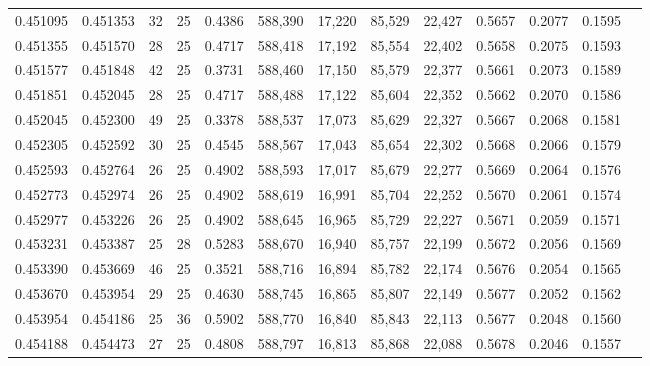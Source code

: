 \begin{tabular}{rrrrrrrrrrrrr}
0.451095 & 0.451353 &    32 &  25 &                                     0.4386 & 588,390 &  17,220 &  85,529 &  22,427 & 0.5657 & 0.2077 & 0.1595 \\
0.451355 & 0.451570 &    28 &  25 &                                     0.4717 & 588,418 &  17,192 &  85,554 &  22,402 & 0.5658 & 0.2075 & 0.1593 \\
0.451577 & 0.451848 &    42 &  25 &                                     0.3731 & 588,460 &  17,150 &  85,579 &  22,377 & 0.5661 & 0.2073 & 0.1589 \\
0.451851 & 0.452045 &    28 &  25 &                                     0.4717 & 588,488 &  17,122 &  85,604 &  22,352 & 0.5662 & 0.2070 & 0.1586 \\
0.452045 & 0.452300 &    49 &  25 &                                     0.3378 & 588,537 &  17,073 &  85,629 &  22,327 & 0.5667 & 0.2068 & 0.1581 \\
0.452305 & 0.452592 &    30 &  25 &                                     0.4545 & 588,567 &  17,043 &  85,654 &  22,302 & 0.5668 & 0.2066 & 0.1579 \\
0.452593 & 0.452764 &    26 &  25 &                                     0.4902 & 588,593 &  17,017 &  85,679 &  22,277 & 0.5669 & 0.2064 & 0.1576 \\
0.452773 & 0.452974 &    26 &  25 &                                     0.4902 & 588,619 &  16,991 &  85,704 &  22,252 & 0.5670 & 0.2061 & 0.1574 \\
0.452977 & 0.453226 &    26 &  25 &                                     0.4902 & 588,645 &  16,965 &  85,729 &  22,227 & 0.5671 & 0.2059 & 0.1571 \\
0.453231 & 0.453387 &    25 &  28 &                                     0.5283 & 588,670 &  16,940 &  85,757 &  22,199 & 0.5672 & 0.2056 & 0.1569 \\
0.453390 & 0.453669 &    46 &  25 &                                     0.3521 & 588,716 &  16,894 &  85,782 &  22,174 & 0.5676 & 0.2054 & 0.1565 \\
0.453670 & 0.453954 &    29 &  25 &                                     0.4630 & 588,745 &  16,865 &  85,807 &  22,149 & 0.5677 & 0.2052 & 0.1562 \\
0.453954 & 0.454186 &    25 &  36 &                                     0.5902 & 588,770 &  16,840 &  85,843 &  22,113 & 0.5677 & 0.2048 & 0.1560 \\
0.454188 & 0.454473 &    27 &  25 &                                     0.4808 & 588,797 &  16,813 &  85,868 &  22,088 & 0.5678 & 0.2046 & 0.1557 \\

\end{tabular}
